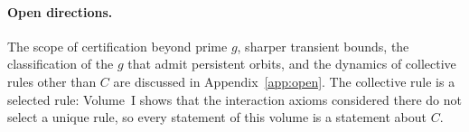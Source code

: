 \paragraph{Open directions.} The scope of certification beyond prime \(g\), sharper transient bounds, the classification of the \(g\) that admit persistent orbits, and the dynamics of collective rules other than \(C\) are discussed in Appendix~\ref{app:open}. The collective rule is a selected rule: Volume~I shows that the interaction axioms considered there do not select a unique rule, so every statement of this volume is a statement about \(C\).
